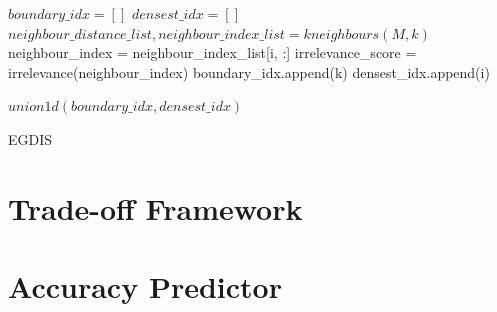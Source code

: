 \begin{algorithm}[H]

$boundary\_idx = []$ \;
$densest\_idx = []$ \;
$neighbour\_distance\_list, neighbour\_index\_list = kneighbours(M, k)$ \;
 {
 	neighbour\_index = neighbour\_index\_list[i, :] \;
	irrelevance\_score = irrelevance(neighbour\_index) \;
	 {
		boundary\_idx.append(k) \;
	}{ 
	{densest\_idx.append(i)}}
}

\Return $union1d(boundary\_idx, densest\_idx)$ \;

\caption{EGDIS}
\end{algorithm}




\section{Trade-off Framework}


\section{Accuracy Predictor}